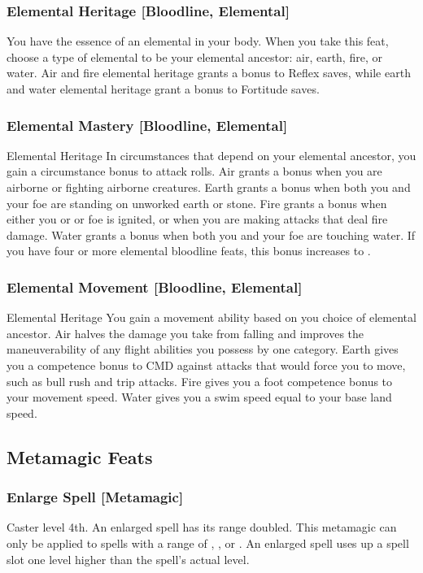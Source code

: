 \subsubsection{Elemental Heritage [Bloodline, Elemental]}
\featben You have the essence of an elemental in your body. When you take this feat, choose a type of elemental to be your elemental ancestor: air, earth, fire, or water. Air and fire elemental heritage grants a  bonus to Reflex saves, while earth and water elemental heritage grant a  bonus to Fortitude saves.

\subsubsection{Elemental Mastery [Bloodline, Elemental]}
\featpre Elemental Heritage
\featben In circumstances that depend on your elemental ancestor, you gain a  circumstance bonus to attack rolls. Air grants a bonus when you are airborne or fighting airborne creatures. Earth grants a bonus when both you and your foe are standing on unworked earth or stone. Fire grants a bonus when either you or or foe is ignited, or when you are making attacks that deal fire damage. Water grants a bonus when both you and your foe are touching water. If you have four or more elemental bloodline feats, this bonus increases to .

\subsubsection{Elemental Movement [Bloodline, Elemental]}
\featpre Elemental Heritage
\featben You gain a movement ability based on you choice of elemental ancestor. Air halves the damage you take from falling and improves the maneuverability of any flight abilities you possess by one category. Earth gives you a  competence bonus to CMD against attacks that would force you to move, such as bull rush and trip attacks. Fire gives you a  foot competence bonus to your movement speed. Water gives you a swim speed equal to your base land speed.

\subsection{Metamagic Feats}

\subsubsection{Enlarge Spell [Metamagic]}
 Caster level 4th.
 An enlarged spell has its range doubled. This metamagic can only be applied to spells with a range of \rngclose, \rngmed, or \rnglong. An enlarged spell uses up a spell slot one level higher than the spell's actual level.

